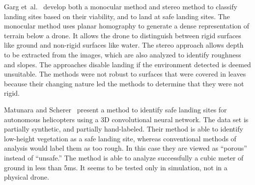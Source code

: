 Garg et~al.~\cite{landing_cues} develop both a monocular method and stereo method to classify landing sites based on their viability, and to land at safe landing sites. The monocular method uses planar homography to generate a dense representation of terrain below a drone. It allows the drone to distinguish between rigid surfaces like ground and non-rigid surfaces like water. The stereo approach allows depth to be extracted from the images, which are also analyzed to identify roughness and slopes. The approaches disable landing if the environment detected is deemed unsuitable. The methods were not robust to surfaces that were covered in leaves because their changing nature led the methods to determine that they were not rigid.

Matunara and Scherer~\cite{conv_3d_lidar_landing} present a method to identify safe landing sites for autonomous helicopters using a 3D convolutional neural network. The data set is partially synthetic, and partially hand-labeled. Their method is able to identify low-height vegetation as a safe landing site, whereas conventional methods of analysis would label them as too rough. In this case they are viewed as ``porous'' instead of ``unsafe.'' The method is able to analyze successfully a cubic meter of ground in less than 5ms. It seems to be tested only in simulation, not in a physical drone.
